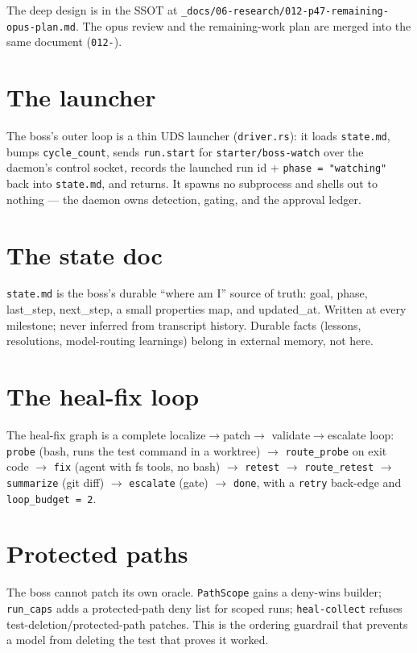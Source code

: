 \documentclass[
	fontsize=10pt,
	twoside=false,
	secnumdepth=2,
	open=any,
]{kaobook}
\begin{document}
The deep design is in the SSOT at
\texttt{\_docs/06-research/012-p47-remaining-opus-plan.md}. The opus review and the
remaining-work plan are merged into the same document (\texttt{012-}).

\section{The launcher}

The boss's outer loop is a thin UDS launcher (\texttt{driver.rs}): it
loads \texttt{state.md}, bumps \texttt{cycle\_count}, sends
\texttt{run.start} for \texttt{starter/boss-watch} over the daemon's
control socket, records the launched run id + \texttt{phase =
"watching"} back into \texttt{state.md}, and returns. It spawns no
subprocess and shells out to nothing — the daemon owns detection, gating,
and the approval ledger.

\section{The state doc}

\texttt{state.md} is the boss's durable ``where am I'' source of truth:
goal, phase, last\_step, next\_step, a small properties map, and
updated\_at. Written at every milestone; never inferred from transcript
history. Durable facts (lessons, resolutions, model-routing learnings)
belong in external memory, not here.

\section{The heal-fix loop}

The heal-fix graph is a complete localize$\rightarrow$patch$\rightarrow$
validate$\rightarrow$escalate loop: \texttt{probe} (bash, runs the test
command in a worktree) $\rightarrow$ \texttt{route\_probe} on exit code
$\rightarrow$ \texttt{fix} (agent with fs tools, no bash)
$\rightarrow$ \texttt{retest} $\rightarrow$ \texttt{route\_retest}
$\rightarrow$ \texttt{summarize} (git diff) $\rightarrow$ \texttt{escalate}
(gate) $\rightarrow$ \texttt{done}, with a \texttt{retry} back-edge and
\texttt{loop\_budget = 2}.

\section{Protected paths}

The boss cannot patch its own oracle. \texttt{PathScope} gains a
deny-wins builder; \texttt{run\_caps} adds a protected-path deny list for
scoped runs; \texttt{heal-collect} refuses test-deletion/protected-path
patches. This is the ordering guardrail that prevents a model from
deleting the test that proves it worked.
\end{document}

